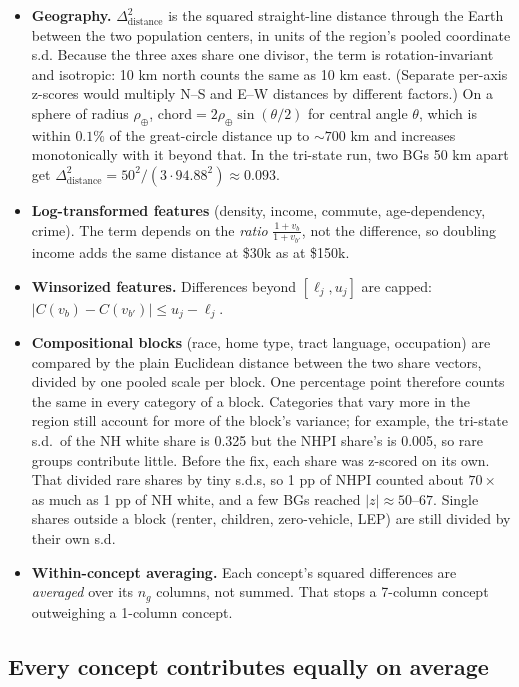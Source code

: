 \documentclass[11pt]{article}
\begin{document}
\begin{itemize}
\item \textbf{Geography.} $\Delta^2_{\text{distance}}$ is the squared straight-line distance
  through the Earth between the two population centers, in units of the region's pooled
  coordinate s.d. Because the three axes share one divisor, the term is rotation-invariant and
  isotropic: 10 km north counts the same as 10 km east. (Separate per-axis z-scores would
  multiply N--S and E--W distances by different factors.) On a sphere of radius $\rho_\oplus$,
  $\text{chord}=2\rho_\oplus\sin(\theta/2)$ for central angle $\theta$, which is within $0.1\%$
  of the great-circle distance up to $\sim700$ km and increases monotonically with it beyond
  that. In the tri-state run, two BGs 50 km apart get
  $\Delta^2_{\text{distance}}=50^2/(3\cdot94.88^2)\approx0.093$.
\item \textbf{Log-transformed features} (density, income, commute, age-dependency, crime).
  The term depends on the \emph{ratio} $\frac{1+v_b}{1+v_{b'}}$, not the difference, so
  doubling income adds the same distance at \$30k as at \$150k.
\item \textbf{Winsorized features.} Differences beyond $[\ell_j,u_j]$ are capped:
  $|C(v_b)-C(v_{b'})|\le u_j-\ell_j$.
\item \textbf{Compositional blocks} (race, home type, tract language, occupation) are compared
  by the plain Euclidean distance between the two share vectors, divided by one pooled scale
  per block. One percentage point therefore counts the same in every category of a block.
  Categories that vary more in the region still account for more of the block's variance;
  for example, the tri-state s.d.\ of the NH white share is 0.325 but the NHPI share's is
  0.005, so rare groups contribute little.
  Before the fix, each share was z-scored on its own. That divided rare shares by tiny
  s.d.s, so 1 pp of NHPI counted about $70\times$ as much as 1 pp of NH white, and a few BGs
  reached $|z|\approx50$--$67$.
  Single shares outside a block (renter, children, zero-vehicle, LEP) are still divided by
  their own s.d.
\item \textbf{Within-concept averaging.} Each concept's squared differences are
  \emph{averaged} over its $n_g$ columns, not summed. That stops a 7-column concept outweighing
  a 1-column concept.
\end{itemize}

\subsection{Every concept contributes equally on average}
\label{sec:contrib}
\end{document}

